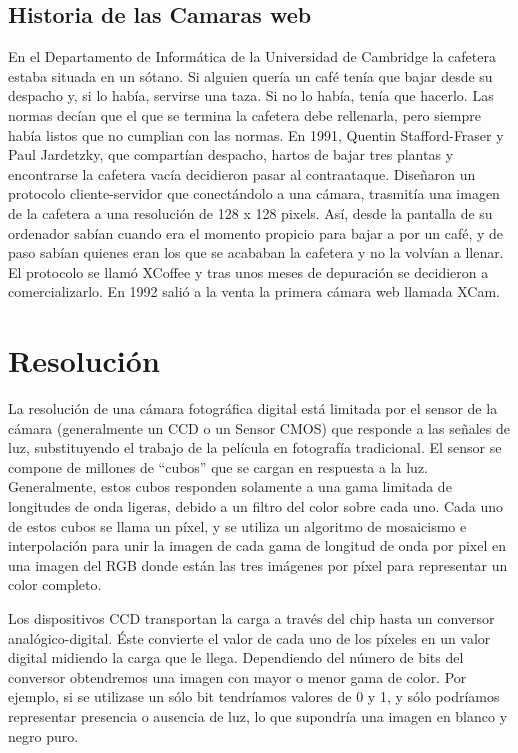 \documentclass[12pt,a4paper]{report}
\begin{document}
\subsection{Historia de las Camaras web}

En el Departamento de Informática de la Universidad de Cambridge la cafetera
estaba situada en un sótano. Si alguien quería un café tenía que bajar desde su
despacho y, si lo había, servirse una taza. Si no lo había, tenía que hacerlo.
Las normas decían que el que se termina la cafetera debe rellenarla, pero
siempre había listos que no cumplian con las normas.
En 1991, Quentin Stafford-Fraser y Paul Jardetzky, que compartían despacho,
hartos de bajar tres plantas y encontrarse la cafetera vacía decidieron pasar al
contraataque. Diseñaron un protocolo cliente-servidor que conectándolo a una
cámara, trasmitía una imagen de la cafetera a una resolución de 128 x 128
pixels.
Así, desde la pantalla de su ordenador sabían cuando era el momento propicio
para bajar a por un café, y de paso sabían quienes eran los que se acababan la
cafetera y no la volvían a llenar. El protocolo se llamó XCoffee y tras unos
meses de depuración se decidieron a comercializarlo. En 1992 salió a la venta la
primera cámara web llamada XCam.

\section{Resolución}

La resolución de una cámara fotográfica digital está limitada por el sensor de
la cámara (generalmente un CCD o un Sensor CMOS) que responde a las señales de
luz, substituyendo el trabajo de la película en fotografía tradicional. El
sensor se compone de millones de “cubos” que se cargan en respuesta a la luz.
Generalmente, estos cubos responden solamente a una gama limitada de longitudes
de onda ligeras, debido a un filtro del color sobre cada uno. Cada uno de estos
cubos se llama un píxel, y se utiliza un algoritmo de mosaicismo e interpolación
para unir la imagen de cada gama de longitud de onda por pixel en una imagen del
RGB donde están las tres imágenes por píxel para representar un color completo.

Los dispositivos CCD transportan la carga a través del chip hasta un conversor
analógico-digital. Éste convierte el valor de cada uno de los píxeles en un
valor digital midiendo la carga que le llega. Dependiendo del número de bits del
conversor obtendremos una imagen con mayor o menor gama de color. Por ejemplo,
si se utilizase un sólo bit tendríamos valores de 0 y 1, y sólo podríamos
representar presencia o ausencia de luz, lo que supondría una imagen en blanco y
negro puro.
\end{document}
